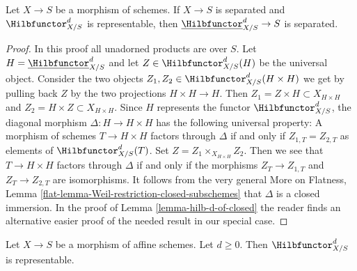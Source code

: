 \begin{lemma}
\label{lemma-hilb-d-separated}
Let $X \to S$ be a morphism of schemes. If $X \to S$ is separated and
$\Hilbfunctor^d_{X/S}$ is representable,
then $\underline{\Hilbfunctor}^d_{X/S} \to S$ is separated.
\end{lemma}

\begin{proof}
In this proof all unadorned products are over $S$.
Let $H = \underline{\Hilbfunctor}^d_{X/S}$ and let
$Z \in \Hilbfunctor^d_{X/S}(H)$ be the universal object.
Consider the two objects $Z_1, Z_2 \in \Hilbfunctor^d_{X/S}(H \times H)$
we get by pulling back $Z$ by the two projections $H \times H \to H$.
Then $Z_1 = Z \times H \subset X_{H \times H}$ and $Z_2 = H \times Z
\subset X_{H \times H}$. Since $H$ represents the functor
$\Hilbfunctor^d_{X/S}$, the diagonal morphism $\Delta : H \to H \times H$
has the following universal property: A morphism of schemes
$T \to H \times H$ factors through $\Delta$ if and only if
$Z_{1, T} = Z_{2, T}$ as elements of $\Hilbfunctor^d_{X/S}(T)$.
Set $Z = Z_1 \times_{X_{H \times H}} Z_2$. Then we see that
$T \to H \times H$ factors through $\Delta$ if and only if
the morphisms $Z_T \to Z_{1, T}$ and $Z_T \to Z_{2, T}$ are
isomorphisms. It follows from the very general
More on Flatness, Lemma \ref{flat-lemma-Weil-restriction-closed-subschemes}
that $\Delta$ is a closed immersion. In the proof of
Lemma \ref{lemma-hilb-d-of-closed}
the reader finds an alternative easier proof of the needed result
in our special case.
\end{proof}

\begin{lemma}
\label{lemma-hilb-d-An}
Let $X \to S$ be a morphism of affine schemes. Let $d \geq 0$. Then
$\Hilbfunctor^d_{X/S}$ is representable.
\end{lemma}

